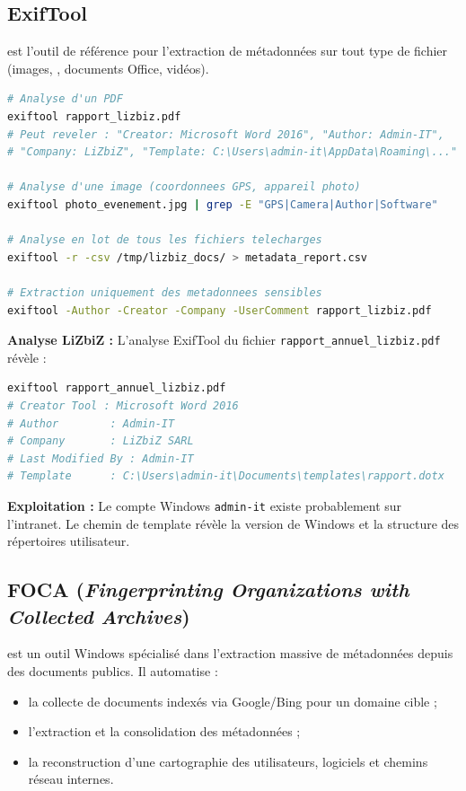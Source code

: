 \subsection{ExifTool}
\label{subsec:exiftool}

 est l'outil de référence pour l'extraction de métadonnées
sur tout type de fichier (images, , documents Office, vidéos).

\begin{lstlisting}[language=bash, caption={Extraction de métadonnées avec ExifTool}]
# Analyse d'un PDF
exiftool rapport_lizbiz.pdf
# Peut reveler : "Creator: Microsoft Word 2016", "Author: Admin-IT",
# "Company: LiZbiZ", "Template: C:\Users\admin-it\AppData\Roaming\..."

# Analyse d'une image (coordonnees GPS, appareil photo)
exiftool photo_evenement.jpg | grep -E "GPS|Camera|Author|Software"

# Analyse en lot de tous les fichiers telecharges
exiftool -r -csv /tmp/lizbiz_docs/ > metadata_report.csv

# Extraction uniquement des metadonnees sensibles
exiftool -Author -Creator -Company -UserComment rapport_lizbiz.pdf
\end{lstlisting}

\begin{boxlizbiz}
\textbf{Analyse LiZbiZ :}
L'analyse ExifTool du fichier \texttt{rapport\_annuel\_lizbiz.pdf} révèle :
\begin{lstlisting}[language=bash]
exiftool rapport_annuel_lizbiz.pdf
# Creator Tool : Microsoft Word 2016
# Author        : Admin-IT
# Company       : LiZbiZ SARL
# Last Modified By : Admin-IT
# Template      : C:\Users\admin-it\Documents\templates\rapport.dotx
\end{lstlisting}
\textbf{Exploitation :} Le compte Windows \texttt{admin-it} existe
probablement sur l'intranet. Le chemin de template révèle la version de
Windows et la structure des répertoires utilisateur.
\end{boxlizbiz}

\subsection{FOCA (\textit{Fingerprinting Organizations with Collected Archives})}
\label{subsec:foca}

 est un outil Windows spécialisé dans l'extraction massive
de métadonnées depuis des documents publics. Il automatise :
\begin{itemize}
    \item la collecte de documents indexés via Google/Bing pour un domaine cible ;
    \item l'extraction et la consolidation des métadonnées ;
    \item la reconstruction d'une cartographie des utilisateurs, logiciels
          et chemins réseau internes.
\end{itemize}

